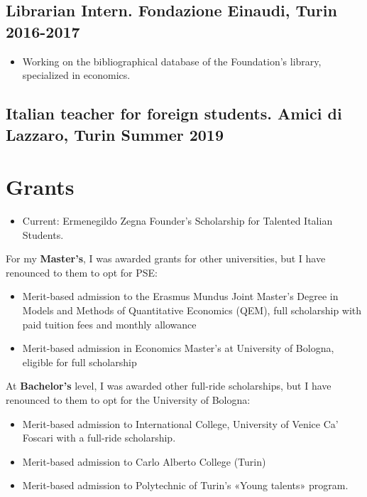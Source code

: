 \documentclass[10pt, a4paper]{extarticle}
\begin{document}
\subsection{\textbf{Librarian Intern}. Fondazione Einaudi, Turin \textbar{}
2016-2017}

\begin{itemize}
\item
  Working on the bibliographical database of the Foundation's
  library, specialized in economics.
\end{itemize}

\subsection{\textbf{Italian teacher for foreign students}. Amici di Lazzaro, Turin
\textbar{} Summer 2019}

\vspace{3pt}\hypertarget{grants}{%
\section{Grants}\label{grants}}

\begin{itemize}
\item
  Current: Ermenegildo Zegna Founder's Scholarship for Talented Italian
  Students.
\end{itemize}

For my \textbf{Master's}, I was awarded grants for other universities,
but I have renounced to them to opt for PSE:

\begin{itemize}
\item
  Merit-based admission to the Erasmus Mundus Joint Master's Degree in
  Models and Methods of Quantitative Economics (QEM), full scholarship
  with paid tuition fees and monthly allowance
\item
  Merit-based admission in Economics Master's at University of Bologna,
  eligible for full scholarship
\end{itemize}

At \textbf{Bachelor's} level, I was awarded other full-ride
scholarships, but I have renounced to them to opt for the University of
Bologna:

\begin{itemize}
\item
  Merit-based admission to International College, University of Venice
  Ca' Foscari with a full-ride scholarship.
\item
  Merit-based admission to Carlo Alberto College (Turin)
\item
  Merit-based admission to Polytechnic of Turin's «Young talents»
  program.
\end{itemize}
\end{document}
